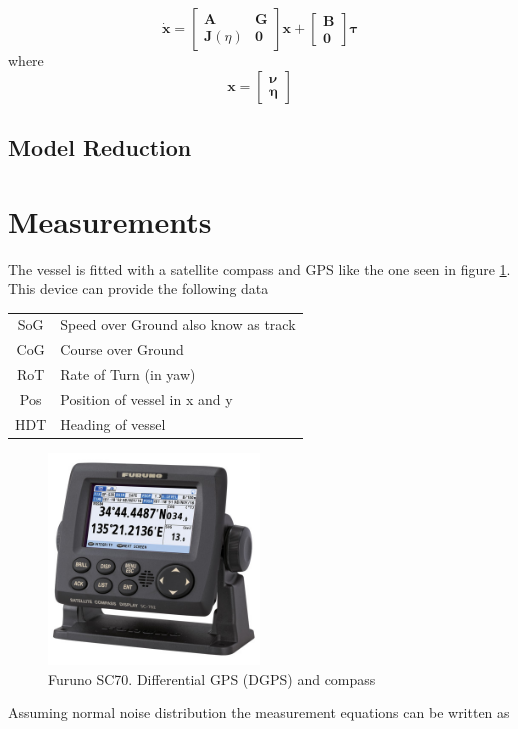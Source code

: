 \documentclass[12pt,a4]{article}
\begin{document}
\begin{equation}
	\bm{\dot{x}} =	\begin{bmatrix} \bm{A} & \bm{G} \\ \bm{J}(\eta) & \bm{0} \end{bmatrix}\bm{x}
	+ \begin{bmatrix}	\bm{B} \\ \bm{0}	\end{bmatrix}\bm{\tau}
\end{equation}
where
\begin{equation}
	\bm{x} = 		\begin{bmatrix}		\bm{\nu}\\\bm{\eta}	\end{bmatrix}
\end{equation}

\subsection{Model Reduction}

\section{Measurements}
The vessel is fitted with a satellite compass and GPS like the one seen in figure \ref{fig:Furuno_SC70}. This device can provide the following data
\begin{table}[H]
	\centering
	\begin{tabular}{c|l}
		SoG & Speed over Ground also know as track \\
		CoG & Course over Ground                   \\
		RoT & Rate of Turn (in yaw)                \\
		Pos & Position of vessel in x and y        \\
		HDT & Heading of vessel
	\end{tabular}
\end{table}
\begin{figure}[H]
	\centering
	\includegraphics[width = 0.5\textwidth]{graphics/Furuno SC70.jpg}
	\caption{Furuno SC70. Differential GPS (DGPS) and compass}
	\label{fig:Furuno_SC70}
\end{figure}
Assuming normal noise distribution the measurement equations can be written as
\end{document}
